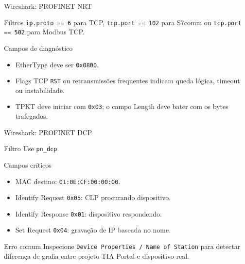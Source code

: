 \documentclass[10pt, aspectratio=169]{beamer}
\begin{document}
\begin{frame}{Wireshark: PROFINET NRT}
    \small
    \begin{block}{Filtros}
        \texttt{ip.proto == 6} para TCP, \texttt{tcp.port == 102} para S7comm ou \texttt{tcp.port == 502} para Modbus TCP.
    \end{block}

    \begin{block}{Campos de diagn\'ostico}
        \begin{itemize}
            \item EtherType deve ser \texttt{0x0800}.
            \item Flags TCP \texttt{RST} ou retransmiss\~oes frequentes indicam queda l\'ogica, timeout ou instabilidade.
            \item TPKT deve iniciar com \texttt{0x03}; o campo Length deve bater com os bytes trafegados.
        \end{itemize}
    \end{block}
\end{frame}

\begin{frame}{Wireshark: PROFINET DCP}
    \small
    \begin{block}{Filtro}
        Use \texttt{pn\_dcp}.
    \end{block}

    \begin{block}{Campos cr\'iticos}
        \begin{itemize}
            \item MAC destino: \texttt{01:0E:CF:00:00:00}.
            \item Identify Request \texttt{0x05}: CLP procurando dispositivo.
            \item Identify Response \texttt{0x01}: dispositivo respondendo.
            \item Set Request \texttt{0x04}: grava\c{c}\~ao de IP baseada no nome.
        \end{itemize}
    \end{block}

    \begin{block}{Erro comum}
        Inspecione \texttt{Device Properties / Name of Station} para detectar diferen\c{c}a de grafia entre projeto TIA Portal e dispositivo real.
    \end{block}
\end{frame}
\end{document}
